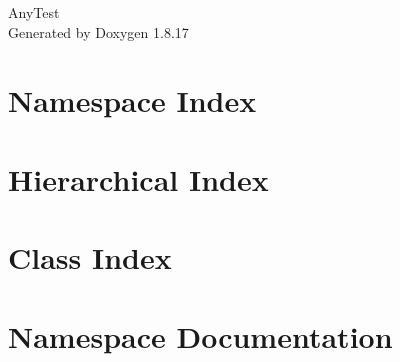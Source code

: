 \let\mypdfximage\pdfximage\def\pdfximage{\immediate\mypdfximage}\documentclass[twoside]{book}
\newcommand{\+}{\discretionary{\mbox{\scriptsize$\hookleftarrow$}}{}{}}
\newcommand{\clearemptydoublepage}{%
  \newpage{\pagestyle{empty}\cleardoublepage}%
}
\begin{document}
\hypersetup{pageanchor=false,
             bookmarksnumbered=true,
             pdfencoding=unicode
            }
\begin{titlepage}
\vspace*{7cm}
\begin{center}%
{\Large Any\+Test }\\
\vspace*{1cm}
{\large Generated by Doxygen 1.8.17}\\
\end{center}
\end{titlepage}
\clearemptydoublepage
{}
\tableofcontents
\clearemptydoublepage
{}
\hypersetup{pageanchor=true}

\chapter{Namespace Index}

\chapter{Hierarchical Index}

\chapter{Class Index}

\chapter{Namespace Documentation}












\end{document}
